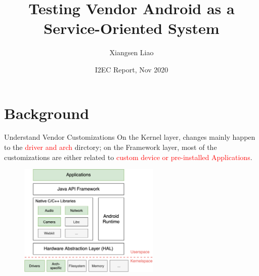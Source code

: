 \documentclass[notheorems, aspectratio=54]{beamer}
\title[Testing Vendor Android as a Service-Oriented System]{Testing Vendor Android as a Service-Oriented System}
\author{Xiangsen Liao}
\institute[ICS] %
{
	Institute of Computer Software\\
	Nanjing University
}
\date[Report 2020.10] %
{I2EC Report, Nov 2020}
\begin{document}
\begin{frame}
    \titlepage
\end{frame}

\section{Background}

\begin{frame}
	
	\begin{block}{Understand Vendor Customizations}
		On the Kernel layer, changes mainly happen to the \textcolor{red}{driver and arch} dirctory; on the Framework layer, most of the customizations are either related to \textcolor{red}{custom device or pre-installed Applications}.
		\begin{figure}
			\centering
			\includegraphics[width=0.6\textwidth]{res/Android-layers.png}
			\vspace*{-0.2cm}
		\end{figure}
	\end{block}

\end{frame}
\end{document}
